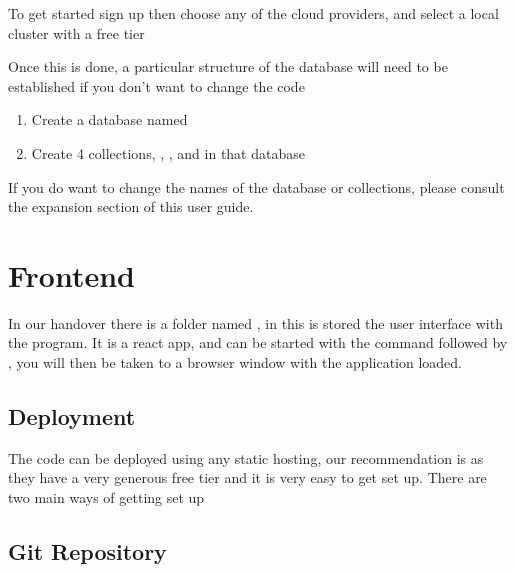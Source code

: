\documentclass[letterpaper,10pt,english]{sphinxmanual}
\let\oldsubsection\subsection
\renewcommand{\subsection}{\needspace{6\baselineskip}\oldsubsection}
\begin{document}
To get started sign up 
then choose any of the cloud providers, and select a local cluster with
a free tier

Once this is done, a particular structure of the database will need to
be established if you don’t want to change the code
\begin{enumerate}
%
\item {} 
Create a database named 

\item {} 
Create 4 collections, , ,  and  in
that database

\end{enumerate}

If you do want to change the names of the database or collections,
please consult the expansion section of this user guide.


\section{Frontend}
\label{\detokenize{docs/Installation/frontEnd:frontend}}\label{\detokenize{docs/Installation/frontEnd::doc}}
In our handover there is a folder named , in this is stored
the user interface with the program. It is a react app, and can be
started with the command  followed by , you
will then be taken to a browser window with the application loaded.


\subsection{Deployment}
\label{\detokenize{docs/Installation/frontEnd:deployment}}
The code can be deployed using any static hosting, our
recommendation is  as they have a very
generous free tier and it is very easy to get set up. There are two main
ways of getting set up


\subsection{Git Repository}
\label{\detokenize{docs/Installation/frontEnd:git-repository}}
\end{document}
